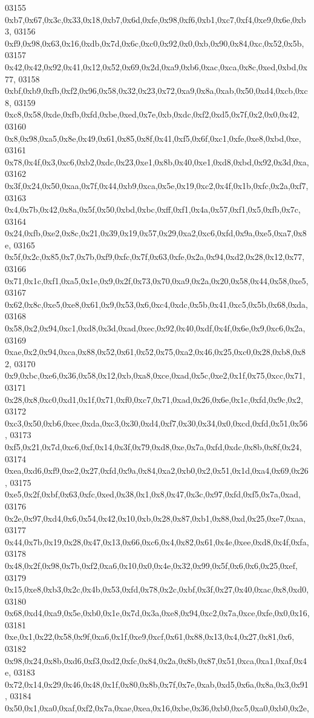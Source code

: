 \begin{DoxyCode}
03155   0xb7,0x67,0x3c,0x33,0x18,0xb7,0x6d,0xfe,0x98,0xf6,0xb1,0xc7,0xf4,0xe9,0x6e,0xb3,
03156   0xf9,0x98,0x63,0x16,0xdb,0x7d,0x6c,0xc0,0x92,0x0,0xb,0x90,0x84,0xc,0x52,0x5b,
03157   0x42,0x42,0x92,0x41,0x12,0x52,0x69,0x2d,0xa9,0xb6,0xac,0xca,0x8c,0xed,0xbd,0x77,
03158   0xbf,0xb9,0xfb,0xf2,0x96,0x58,0x32,0x23,0x72,0xa9,0x8a,0xab,0x50,0xd4,0xcb,0xc8,
03159   0xc8,0x58,0xde,0xfb,0xfd,0xbe,0xed,0x7e,0xb,0xdc,0xf2,0xd5,0x7f,0x2,0x0,0x42,
03160   0x8,0x98,0xa5,0x8e,0x49,0x61,0x85,0x8f,0x41,0xf5,0x6f,0xc1,0xfe,0xe8,0xbd,0xe,
03161   0x78,0x4f,0x3,0xc6,0xb2,0xdc,0x23,0xe1,0x8b,0x40,0xe1,0xd8,0xbd,0x92,0x3d,0xa,
03162   0x3f,0x24,0x50,0xaa,0x7f,0x44,0xb9,0xca,0x5e,0x19,0xc2,0x4f,0x1b,0xfc,0x2a,0xf7,
03163   0x4,0x7b,0x42,0x8a,0x5f,0x50,0xbd,0xbc,0xff,0xf1,0x4a,0x57,0xf1,0x5,0xfb,0x7c,
03164   0x24,0xfb,0xe2,0x8c,0x21,0x39,0x19,0x57,0x29,0xa2,0xc6,0xfd,0x9a,0xe5,0xa7,0x8e,
03165   0x5f,0x2c,0x85,0x7,0x7b,0xf9,0xfc,0x7f,0x63,0xfe,0x2a,0x94,0xd2,0x28,0x12,0x77,
03166   0x71,0x1c,0xf1,0xa5,0x1e,0x9,0x2f,0x73,0x70,0xa9,0x2a,0x20,0x58,0x44,0x58,0xe5,
03167   0x62,0x8c,0xe5,0xe8,0x61,0x9,0x53,0x6,0xc4,0xdc,0x5b,0x41,0xc5,0x5b,0x68,0xda,
03168   0x58,0x2,0x94,0xc1,0xd8,0x3d,0xad,0xec,0x92,0x40,0xdf,0x4f,0x6e,0x9,0xc6,0x2a,
03169   0xae,0x2,0x94,0xca,0x88,0x52,0x61,0x52,0x75,0xa2,0x46,0x25,0xc0,0x28,0xb8,0x82,
03170   0x9,0xbc,0xe6,0x36,0x58,0x12,0xb,0xa8,0xce,0xad,0x5c,0xe2,0x1f,0x75,0xcc,0x71,
03171   0x28,0x8,0xc0,0xd1,0x1f,0x71,0xf0,0xc7,0x71,0xad,0x26,0x6e,0x1c,0xfd,0x9c,0x2,
03172   0xc3,0x50,0xb6,0xec,0xda,0xc3,0x30,0xd4,0xf7,0x30,0x34,0x0,0xcd,0xfd,0x51,0x56,
03173   0xf5,0x21,0x7d,0xc6,0xf,0x14,0x3f,0x79,0xd8,0xe,0x7a,0xfd,0xdc,0x8b,0x8f,0x24,
03174   0xea,0xd6,0xf9,0xe2,0x27,0xfd,0x9a,0x84,0xa2,0xb0,0x2,0x51,0x1d,0xa4,0x69,0x26,
03175   0xe5,0x2f,0xbf,0x63,0xfc,0xed,0x38,0x1,0x8,0x47,0x3c,0x97,0xfd,0xf5,0x7a,0xad,
03176   0x2e,0x97,0xd4,0x6,0x54,0x42,0x10,0xb,0x28,0x87,0xb1,0x88,0xd,0x25,0xe7,0xaa,
03177   0x44,0x7b,0x19,0x28,0x47,0x13,0x66,0xc6,0x4,0x82,0x61,0x4e,0xee,0xd8,0x4f,0xfa,
03178   0x48,0x2f,0x98,0x7b,0xf2,0xa6,0x10,0x0,0x4e,0x32,0x99,0x5f,0x6,0x6,0x25,0xef,
03179   0x15,0xe8,0xb3,0x2c,0x4b,0x53,0xfd,0x78,0x2c,0xbf,0x3f,0x27,0x40,0xac,0x8,0xd0,
03180   0x68,0xd4,0xa9,0x5e,0xb0,0x1e,0x7d,0x3a,0xe8,0x94,0xc2,0x7a,0xce,0xfe,0x0,0x16,
03181   0xe,0x1,0x22,0x58,0x9f,0xa6,0x1f,0xe9,0xcf,0x61,0x88,0x13,0x4,0x27,0x81,0x6,
03182   0x98,0x24,0x8b,0xd6,0xf3,0xd2,0xfc,0x84,0x2a,0x8b,0x87,0x51,0xca,0xa1,0xaf,0x4e,
03183   0x72,0x14,0x29,0x46,0x48,0x1f,0x80,0x8b,0x7f,0x7e,0xab,0xd5,0x6a,0x8a,0x3,0x91,
03184   0x50,0x1,0xa0,0xaf,0xf2,0x7a,0xae,0xea,0x16,0xbe,0x36,0xb0,0xc5,0xa0,0xb0,0x2e,

\end{DoxyCode}
